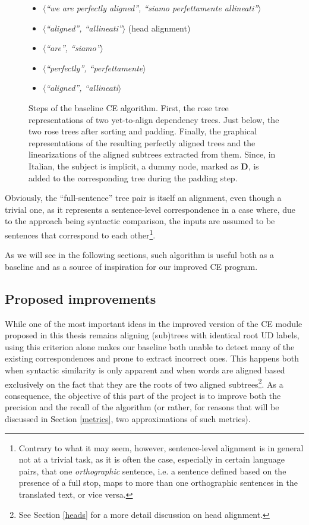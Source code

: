 \begin{figure}[H]
\begin{itemize}
 \item $\langle$\textit{``we are perfectly aligned'', ``siamo perfettamente allineati''}$\rangle$
 \item $\langle$\textit{``aligned'', ``allineati''}$\rangle$ (head alignment)
 \item $\langle$\textit{``are'', ``siamo''}$\rangle$
 \item $\langle$\textit{``perfectly'', ``perfettamente}$\rangle$
 \item $\langle$\textit{``aligned'', ``allineati}$\rangle$
 \end{itemize}
 \caption[Steps of the baseline CE algorithm.]{Steps of the baseline CE algorithm. First, the rose tree representations of two yet-to-align dependency trees. Just below, the two rose trees after sorting and padding. Finally, the graphical representations of the resulting perfectly aligned trees and the linearizations of the aligned subtrees extracted from them. Since, in Italian, the subject is implicit, a dummy node, marked as \textbf{D}, is added to the corresponding tree during the padding step.}
 \label{prefal}
\end{figure}

Obviously, the ``full-sentence'' tree pair is itself an alignment, even though a trivial one, as it represents a sentence-level correspondence in a case where, due to the approach being syntactic comparison, the inputs are assumed to be sentences that correspond to each other\footnote{Contrary to what it may seem, however, sentence-level alignment is in general not at a trivial task, as it is often the case, especially in certain language pairs, that one \textit{orthographic} sentence, i.e. a sentence defined based on the presence of a full stop, maps to more than one orthographic sentences in the translated text, or vice versa.}.

As we will see in the following sections, such algorithm is useful both as a baseline and as a source of inspiration for our improved CE program.

\subsection{Proposed improvements} \label{improvements}
While one of the most important ideas in the improved version of the CE module proposed in this thesis remains aligning (sub)trees with identical root UD labels, using this criterion alone makes our baseline both unable to detect many of the existing correspondences and prone to extract incorrect ones. This happens both when syntactic similarity is only apparent and when words are aligned based exclusively on the fact that they are the roots of two aligned subtrees\footnote{See Section \ref{heads} for a more detail discussion on head alignment.}.
As a consequence, the objective of this part of the project is to improve both the precision and the recall of the algorithm (or rather, for reasons that will be discussed in Section \ref{metrics}, two approximations of such metrics). 

